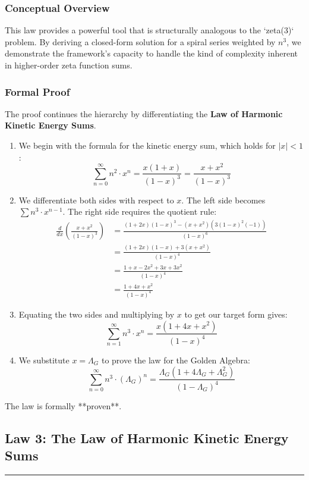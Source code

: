 \subsubsection*{Conceptual Overview}
This law provides a powerful tool that is structurally analogous to the `zeta(3)` problem. By deriving a closed-form solution for a spiral series weighted by $n^3$, we demonstrate the framework's capacity to handle the kind of complexity inherent in higher-order zeta function sums.

\subsubsection*{Formal Proof}
The proof continues the hierarchy by differentiating the \textbf{Law of Harmonic Kinetic Energy Sums}.

\begin{enumerate}
    \item We begin with the formula for the kinetic energy sum, which holds for $|x|<1$:
    $$ \sum_{n=0}^{\infty} n^2 \cdot x^n = \frac{x(1+x)}{(1-x)^3} = \frac{x+x^2}{(1-x)^3} $$
    \item We differentiate both sides with respect to $x$. The left side becomes $\sum n^3 \cdot x^{n-1}$. The right side requires the quotient rule:
    \begin{align*}
        \frac{d}{dx} \left( \frac{x+x^2}{(1-x)^3} \right) &= \frac{(1+2x)(1-x)^3 - (x+x^2)(3(1-x)^2(-1))}{(1-x)^6} \\
        &= \frac{(1+2x)(1-x) + 3(x+x^2)}{(1-x)^4} \\
        &= \frac{1+x-2x^2 + 3x+3x^2}{(1-x)^4} \\
        &= \frac{1+4x+x^2}{(1-x)^4}
    \end{align*}
    \item Equating the two sides and multiplying by $x$ to get our target form gives:
    $$ \sum_{n=1}^{\infty} n^3 \cdot x^{n} = \frac{x(1+4x+x^2)}{(1-x)^4} $$
    \item We substitute $x = \Lambda_G$ to prove the law for the Golden Algebra:
    $$ \sum_{n=0}^{\infty} n^3 \cdot (\Lambda_G)^n = \frac{\Lambda_G(1+4\Lambda_G+\Lambda_G^2)}{(1-\Lambda_G)^4} $$
\end{enumerate}
The law is formally **proven**.

\subsection*{Law 3: The Law of Harmonic Kinetic Energy Sums}
\hrule
\vspace{0.3cm}
\vspace{0.5cm}

